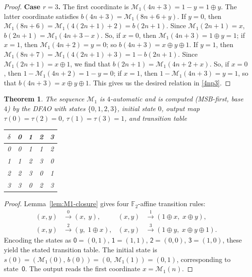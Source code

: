 \documentclass[12pt,reqno]{article}
\theoremstyle{plain}
\newtheorem{theorem}{Theorem}
\theoremstyle{definition}
\theoremstyle{remark}
\begin{document}
\begin{proof}
\textbf{Case $r = 3$.} The first coordinate is $\mathcal{M}_{1}(4n+3) = 1 - y = 1 \oplus y$. The latter coordinate 
 satisfies $b(4n+3) = 
 \mathcal{M}_{1}(8n + 6 + y)$. If $y = 0$, then $\mathcal{M}_{1}(8n+6) = \mathcal{M}_{1}(4(2n+1)+2) = b(2n+1)$.
Since $\mathcal{M}_{1}(2n+1) = x$, $b(2n+1) = \mathcal{M}_{1}(4n + 3 - x)$. So, if $x = 0$, then $\mathcal{M}_{1}(4n+3) = 1 \oplus y = 
 1$; if $x = 1$, then $\mathcal{M}_{1}(4n+2) = y = 0$; so $b(4n+3) = x \oplus y \oplus 1$. If $y = 1$, then $\mathcal{M}_{1}(8 n + 
 7) = \mathcal{M}_{1}(4(2n+1)+3) = 1 - b(2n+1)$. Since $\mathcal{M}_{1}(2n+1) = x \oplus 1$, we find that $b(2n+1) = \mathcal{M}_{1}(4 
 n + 2 + x)$. So, if $x = 0$, then $1 - \mathcal{M}_{1}(4n+2) = 1 - y = 0$; if $x = 1$, then $1 - \mathcal{M}_{1}(4n+3) = y = 1$, so that 
 $b(4n+3) = x \oplus y \oplus 1$. This gives us the desired relation in \eqref{4np3}. 
\end{proof}

\begin{theorem}\label{thm:M1-dfao} 
The sequence $\mathcal{M}_{1}$ is $4$-automatic and is computed (MSB-first, base $4$) by the DFAO 
 with states $\{0,1,2,3\}$, initial state $0$, output map $\tau(0)=\tau(2)=0$, $\tau(1)=\tau(3)=1$, and transition table
\begin{center}
\normalfont
\begin{tabular}{c|cccc}
$\delta$ & 0 & 1 & 2 & 3 \\ \hline
0 & 0 & 1 & 1 & 2 \\
1 & 1 & 2 & 3 & 0 \\
2 & 2 & 3 & 0 & 1 \\
3 & 3 & 0 & 2 & 3 \\
\end{tabular}
\end{center}
\end{theorem}

\begin{proof}
Lemma~\ref{lem:M1-closure} gives four $\mathbb{F}_2$-affine transition rules:
\[
\begin{aligned}
 (x,y) &\xrightarrow{\;0\;} (x,\; y), &
 (x,y) &\xrightarrow{\;1\;} (1 \oplus x,\; x \oplus y), \\
 (x,y) &\xrightarrow{\;2\;} (y,\; 1 \oplus x), &
 (x,y) &\xrightarrow{\;3\;} (1 \oplus y,\; x \oplus y \oplus 1).
\end{aligned}
\]
Encoding the states as
$\mathsf{0} = (0,1)$,
$\mathsf{1} = (1,1)$,
$\mathsf{2} = (0,0)$,
$\mathsf{3} = (1,0)$,
these yield the stated transition table. The initial state is $s(0) = (\mathcal{M}_{1}(0),\, b(0)) = (0,\, \mathcal{M}_{1}(1)) = 
 (0,1)$, corresponding to state~$\mathsf{0}$. The output reads the first coordinate $x = \mathcal{M}_{1}(n)$.
\end{proof}
\end{document}
